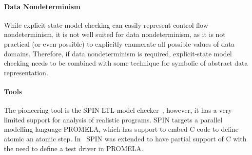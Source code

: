 \paragraph{Data Nondeterminism}
While explicit-state model checking can easily represent control-flow
nondeterminism, it is not well suited for data nondeterminism, as it is not
practical (or even possible) to explicitly enumerate all possible values of
data domains.
Therefore, if data nondeterminism is required, explicit-state model checking
needs to be combined with some technique for symbolic of abstract data
representation.

\paragraph{Tools}

The pioneering tool is the SPIN LTL model
checker~\cite{Holzmann1997,Holzmann2004}, however, it has a very limited
support for analysis of realistic programs.
SPIN targets a parallel modelling language PROMELA, which has support to embed
C code to define atomic an atomic step.
In~\cite{Zaks2008} SPIN was extended to have partial support of C with the need
to define a test driver in PROMELA.

